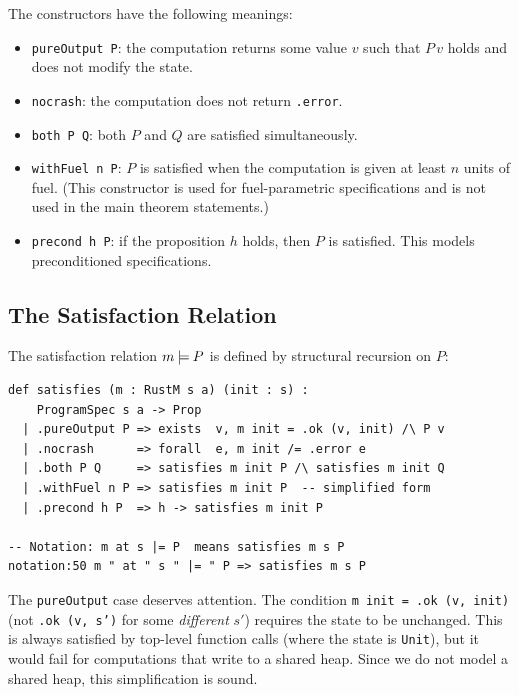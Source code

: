The constructors have the following meanings:

\begin{itemize}[leftmargin=1.5em]
  \item \texttt{pureOutput P}: the computation returns some value $v$ such
        that $P\,v$ holds and does not modify the state.
  \item \texttt{nocrash}: the computation does not return \texttt{.error}.
  \item \texttt{both P Q}: both $P$ and $Q$ are satisfied simultaneously.
  \item \texttt{withFuel n P}: $P$ is satisfied when the computation is
        given at least $n$ units of fuel. (This constructor is used for
        fuel-parametric specifications and is not used in the main theorem
        statements.)
  \item \texttt{precond h P}: if the proposition $h$ holds, then $P$ is
        satisfied. This models preconditioned specifications.
\end{itemize}

\subsection{The Satisfaction Relation}

The satisfaction relation $m \mathbin{\models} P$ is defined by structural recursion
on $P$:

\begin{lstlisting}[caption={Satisfaction relation.},label={lst:sat}]
def satisfies (m : RustM s a) (init : s) :
    ProgramSpec s a -> Prop
  | .pureOutput P => exists  v, m init = .ok (v, init) /\ P v
  | .nocrash      => forall  e, m init /= .error e
  | .both P Q     => satisfies m init P /\ satisfies m init Q
  | .withFuel n P => satisfies m init P  -- simplified form
  | .precond h P  => h -> satisfies m init P

-- Notation: m at s |= P  means satisfies m s P
notation:50 m " at " s " |= " P => satisfies m s P
\end{lstlisting}

The \texttt{pureOutput} case deserves attention. The condition
\texttt{m init = .ok (v, init)} (not \texttt{.ok (v, s')} for some
\emph{different} $s'$) requires the state to be unchanged. This is always
satisfied by top-level function calls (where the state is \texttt{Unit}),
but it would fail for computations that write to a shared heap.
Since we do not model a shared heap, this simplification is sound.

